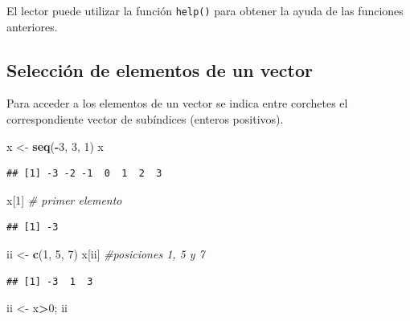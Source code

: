 \documentclass[]{book}
\newenvironment{Shaded}{\begin{snugshade}}{\end{snugshade}}
\newcommand{\CommentTok}[1]{\textcolor[rgb]{0.56,0.35,0.01}{\textit{#1}}}
\newcommand{\DecValTok}[1]{\textcolor[rgb]{0.00,0.00,0.81}{#1}}
\newcommand{\KeywordTok}[1]{\textcolor[rgb]{0.13,0.29,0.53}{\textbf{#1}}}
\newcommand{\NormalTok}[1]{#1}
\newcommand{\OperatorTok}[1]{\textcolor[rgb]{0.81,0.36,0.00}{\textbf{#1}}}
\newcommand{\StringTok}[1]{\textcolor[rgb]{0.31,0.60,0.02}{#1}}
\begin{document}
El lector puede utilizar la función \texttt{help()} para obtener la ayuda de las funciones
anteriores.

\hypertarget{seleccion-de-elementos-de-un-vector}{%
\subsection{Selección de elementos de un vector}\label{seleccion-de-elementos-de-un-vector}}

Para acceder a los elementos de un vector se indica entre corchetes el
correspondiente vector de subíndices (enteros positivos).

\begin{Shaded}
\begin{Highlighting}[]
\NormalTok{x <-}\StringTok{ }\KeywordTok{seq}\NormalTok{(}\OperatorTok{-}\DecValTok{3}\NormalTok{, }\DecValTok{3}\NormalTok{, }\DecValTok{1}\NormalTok{)}
\NormalTok{x}
\end{Highlighting}
\end{Shaded}

\begin{verbatim}
## [1] -3 -2 -1  0  1  2  3
\end{verbatim}

\begin{Shaded}
\begin{Highlighting}[]
\NormalTok{x[}\DecValTok{1}\NormalTok{] }\CommentTok{# primer elemento}
\end{Highlighting}
\end{Shaded}

\begin{verbatim}
## [1] -3
\end{verbatim}

\begin{Shaded}
\begin{Highlighting}[]
\NormalTok{ii <-}\StringTok{ }\KeywordTok{c}\NormalTok{(}\DecValTok{1}\NormalTok{, }\DecValTok{5}\NormalTok{, }\DecValTok{7}\NormalTok{)}
\NormalTok{x[ii] }\CommentTok{#posiciones 1, 5 y 7}
\end{Highlighting}
\end{Shaded}

\begin{verbatim}
## [1] -3  1  3
\end{verbatim}

\begin{Shaded}
\begin{Highlighting}[]
\NormalTok{ii <-}\StringTok{ }\NormalTok{x}\OperatorTok{>}\DecValTok{0}\NormalTok{; ii}
\end{Highlighting}
\end{Shaded}
\end{document}
